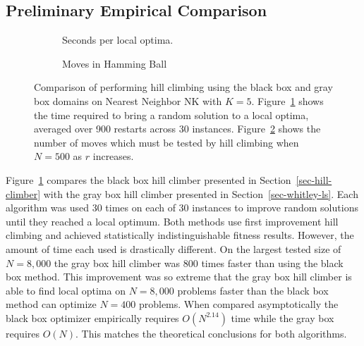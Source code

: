 \subsection{Preliminary Empirical Comparison}
\begin{figure}[t]
  \begin{centering}
    \begin{subfigure}{.5\textwidth}
      \begin{centering}
      \end{centering}
      \caption{Seconds per local optima.}
      \label{fig-hc-time}
    \end{subfigure}%
    \begin{subfigure}{.5\textwidth}
      \begin{centering}
      \end{centering}
      \caption{Moves in Hamming Ball}
      \label{fig-hc-radius}
    \end{subfigure}
  \end{centering}
  \caption{Comparison of performing hill climbing
           using the black box and gray box domains on Nearest Neighbor NK with $K=5$.
           Figure~\ref{fig-hc-time} shows the time required to bring a random
           solution to a local optima, averaged over 900 restarts across 30 instances.
           Figure~\ref{fig-hc-radius} shows the number of moves which must be
           tested by hill climbing when $N=500$ as $r$ increases.}
  \label{fig-hc-compare}
\end{figure}

Figure~\ref{fig-hc-time} compares the black box hill climber presented in Section~\ref{sec-hill-climber}
with the gray box hill climber presented in Section~\ref{sec-whitley-ls}.  Each algorithm was
used 30 times on each of 30 instances to improve random solutions until they reached a local optimum.
Both methods use first improvement hill climbing and achieved statistically indistinguishable fitness results.
However, the amount of time each used is drastically different. On the largest tested size of $N=8,000$ the gray box
hill climber was 800 times faster than using the black box method. This improvement was so extreme
that the gray box hill climber is able to find local optima on $N=8,000$ problems faster than the black box
method can optimize $N=400$ problems.  When compared asymptotically the black box optimizer empirically requires
$O(N^{2.14})$ time while the gray box requires $O(N)$. This matches the theoretical conclusions for both algorithms.

